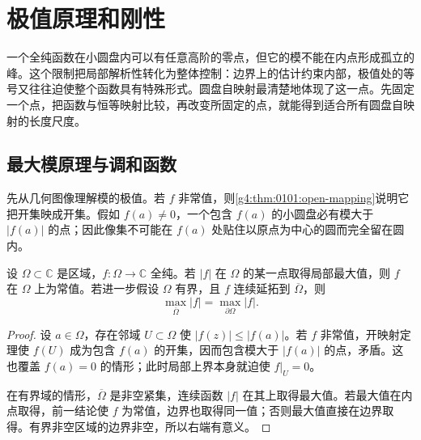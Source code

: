 
% 
% 

\section{极值原理和刚性}
\label{g4:sec:0103}

一个全纯函数在小圆盘内可以有任意高阶的零点，但它的模不能在内点形成孤立的峰。这个限制把局部解析性转化为整体控制：边界上的估计约束内部，极值处的等号又往往迫使整个函数具有特殊形式。圆盘自映射最清楚地体现了这一点。先固定一个点，把函数与恒等映射比较，再改变所固定的点，就能得到适合所有圆盘自映射的长度尺度。

\subsection{最大模原理与调和函数}
\label{g4:subsec:0103:01}
先从几何图像理解模的极值。若 \(f\) 非常值，则\cref{g4:thm:0101:open-mapping}说明它把开集映成开集。假如 \(f(a)\ne0\)，一个包含 \(f(a)\) 的小圆盘必有模大于 \(\lvert f(a)\rvert\) 的点；因此像集不可能在 \(f(a)\) 处贴住以原点为中心的圆而完全留在圆内。

\begin{theorem}[最大模原理]
	\label{g4:thm:0103:maximum-modulus}
	设 \(\Omega\subset\mathbb C\) 是区域，\(f\colon\Omega\rightarrow\mathbb C\) 全纯。若 \(\lvert f\rvert\) 在 \(\Omega\) 的某一点取得局部最大值，则 \(f\) 在 \(\Omega\) 上为常值。若进一步假设 \(\Omega\) 有界，且 \(f\) 连续延拓到 \(\overline\Omega\)，则
	\[
		\max_{\overline\Omega}\lvert f\rvert
		=\max_{\partial\Omega}\lvert f\rvert.
	\]
\end{theorem}

\begin{proof}
	设 \(a\in\Omega\)，存在邻域 \(U\subset\Omega\) 使 \(\lvert f(z)\rvert\leq\lvert f(a)\rvert\)。若 \(f\) 非常值，开映射定理使 \(f(U)\) 成为包含 \(f(a)\) 的开集，因而包含模大于 \(\lvert f(a)\rvert\) 的点，矛盾。这也覆盖 \(f(a)=0\) 的情形；此时局部上界本身就迫使 \(f|_U=0\)。

	在有界域的情形，\(\overline\Omega\) 是非空紧集，连续函数 \(\lvert f\rvert\) 在其上取得最大值。若最大值在内点取得，前一结论使 \(f\) 为常值，边界也取得同一值；否则最大值直接在边界取得。有界非空区域的边界非空，所以右端有意义。
\end{proof}


